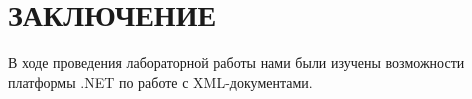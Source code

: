 \section*{ЗАКЛЮЧЕНИЕ}

В ходе проведения лабораторной работы нами были изучены
возможности платформы .NET по работе с XML-документами.

\newpage

